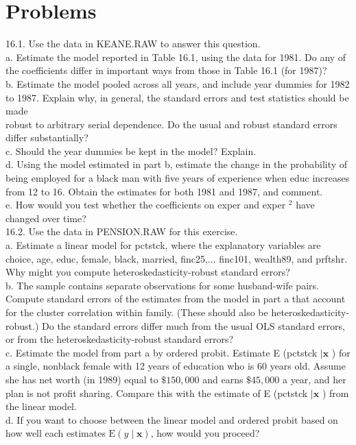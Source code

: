 \documentclass[10pt]{article}
\begin{document}
\section*{Problems}
16.1. Use the data in KEANE.RAW to answer this question.\\
a. Estimate the model reported in Table 16.1, using the data for 1981. Do any of the coefficients differ in important ways from those in Table 16.1 (for 1987)?\\
b. Estimate the model pooled across all years, and include year dummies for 1982 to 1987. Explain why, in general, the standard errors and test statistics should be made\\
robust to arbitrary serial dependence. Do the usual and robust standard errors differ substantially?\\
c. Should the year dummies be kept in the model? Explain.\\
d. Using the model estimated in part b, estimate the change in the probability of being employed for a black man with five years of experience when educ increases from 12 to 16. Obtain the estimates for both 1981 and 1987, and comment.\\
e. How would you test whether the coefficients on exper and exper ${ }^{2}$ have changed over time?\\
16.2. Use the data in PENSION.RAW for this exercise.\\
a. Estimate a linear model for pctstck, where the explanatory variables are choice, age, educ, female, black, married, finc25,... finc101, wealth89, and prftshr. Why might you compute heteroskedasticity-robust standard errors?\\
b. The sample contains separate observations for some husband-wife pairs. Compute standard errors of the estimates from the model in part a that account for the cluster correlation within family. (These should also be heteroskedasticity-robust.) Do the standard errors differ much from the usual OLS standard errors, or from the heteroskedasticity-robust standard errors?\\
c. Estimate the model from part a by ordered probit. Estimate E (pctstck $\mid \mathbf{x}$ ) for a single, nonblack female with 12 years of education who is 60 years old. Assume she has net worth (in 1989) equal to $\$ 150,000$ and earns $\$ 45,000$ a year, and her plan is not profit sharing. Compare this with the estimate of E (pctstck $\mid \mathbf{x}$ ) from the linear model.\\
d. If you want to choose between the linear model and ordered probit based on how well each estimates $\mathrm{E}(y \mid \mathbf{x})$, how would you proceed?\\
\end{document}

